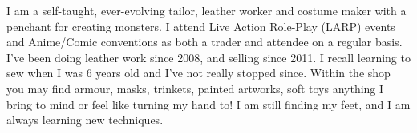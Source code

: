I am a self-taught, ever-evolving tailor, leather worker and costume
maker with a penchant for creating monsters. I attend Live Action
Role-Play (LARP) events and Anime/Comic conventions as both a trader
and attendee on a regular basis. I've been doing leather work since
2008, and selling since 2011. I recall learning to sew when I was 6
years old and I've not really stopped since. Within the shop you may
find armour, masks, trinkets, painted artworks, soft toys
\textellipsis anything I bring to mind or feel like turning my hand
to! I am still finding my feet, and I am always learning new
techniques.

